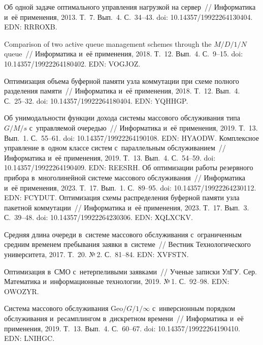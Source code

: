 \begin{multicols}{2}
{{\begin{thebibliography}{99}
 Об одной задаче оптимального управ\-ле\-ния нагрузкой на сервер~// 
Информатика и~её применения, 2013. Т.~7. Вып.~4. С.~34--43. doi: 10.14357/19922264130404. EDN: 
RRROXB.


 Comparison of two active queue management schemes 
through the $M/D/1/N$ queue~// Информатика и~её применения, 2018. Т.~12. Вып.~4. С.~9--15. doi: 
10.14357/19922264180402. EDN: VOGJOZ.

 Оптимизация объема буферной памяти узла коммутации при схеме 
полного разделения памяти~// Информатика и~её применения, 2018. Т.~12. Вып.~4. С.~25--32.
doi: 10.14357/19922264180404. EDN: YQHHGP.


 Об унимодальности функции дохода системы массового 
обслуживания типа $G/M/s$ с~управ\-ля\-емой очередью~// Информатика и~её применения, 
2019. Т.~13. Вып.~1. С.~55--61. doi: 10.14357/19922264190108. EDN: HYAODW.
 Комплексное управ\-ле\-ние в~одном классе систем 
с~параллельным обслуживанием~// Информатика и~её применения, 2019. Т.~13. Вып.~4.  
С.~54--59. doi: 10.14357/19922264190409. EDN: REESRH.
 Об оптимизации работы резервного прибора в~многолинейной системе 
массового обслуживания~// Информатика и~её применения, 2023. Т.~17. Вып.~1. С.~89--95.  doi: 
10.14357/19922264230112. EDN: FCYDUT.
 Оптимизация схемы распределения буферной памяти узла пакетной 
коммутации~// Информатика и~её применения, 2023. Т.~17. Вып.~3. С.~39--48. doi: 
10.14357/19922264230306. EDN: \mbox{ХQLXCKV}.

 Средняя длина очереди в~сис\-те\-ме 
массового обслуживания с~ограниченным средним временем пребывания заявки в~сис\-те\-ме~// 
Вестник Технологического университета, 2017. Т.~20. №\,2. С.~81--84. EDN: 
XVFSTN.

 Оптимизация в~СМО с~нетерпеливыми 
заявками~// Ученые записки УлГУ. Сер. Математика и~информационные технологии, 2019. 
№\,1. С.~92--98. EDN: OWOZYR.

 Система массового обслуживания 
$\mathrm{Geo}/G/1/\infty$ с~инверсионным порядком обслуживания и~ресамплингом в~дискретном 
времени~// Информатика и~её применения, 2019. Т.~13. Вып.~4. С.~60--67. doi: 
10.14357/19922264190410. EDN: LNIHGC.


\end{thebibliography}}}
\end{multicols}
